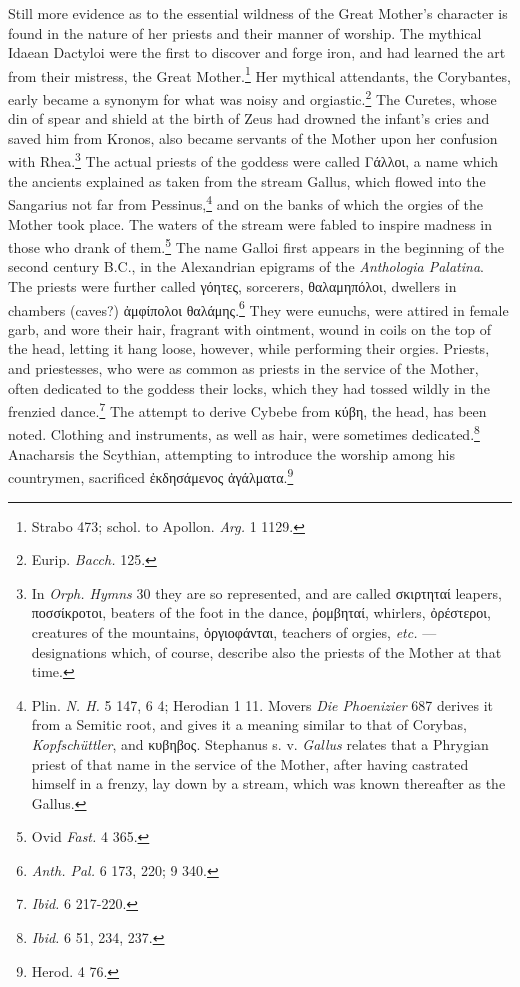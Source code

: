 \documentclass[a4paper, 11pt, oneside, polutonikogreek, english]{article}
\begin{document}
Still more evidence as to the essential wildness of the Great Mother's character is found in the nature of her priests and their manner of worship. The mythical Idaean Dactyloi were the first to discover and forge iron, and had learned the art from their mistress, the Great Mother.\footnote{Strabo 473; schol. to Apollon. \emph{Arg.} 1 1129.} Her mythical attendants, the Corybantes, early became a synonym for what was noisy and orgiastic.\footnote{Eurip. \emph{Bacch.} 125.} The Curetes, whose din of spear and shield at the birth of Zeus had drowned the infant's cries and saved him from Kronos, also became servants of the Mother upon her confusion with Rhea.\footnote{In \emph{Orph. Hymns} 30 they are so represented, and are called σκιρτηταί leapers, ποσσίκροτοι, beaters of the foot in the dance, ῥομβηταί, whirlers, ὀρέστεροι, creatures of the mountains, ὀργιοφάνται, teachers of orgies, \emph{etc.} --- designations which, of course, describe also the priests of the Mother at that time.} The actual priests of the goddess were called Γάλλοι, a name which the ancients explained as taken from the stream Gallus, which flowed into the Sangarius not far from Pessinus,\footnote{Plin. \emph{N. H.} 5 147, 6 4; Herodian 1 11. Movers \emph{Die Phoenizier} 687 derives it from a Semitic root, and gives it a meaning similar to that of Corybas, \emph{Kopfschüttler}, and κυβηβος. Stephanus s. v. \emph{Gallus} relates that a Phrygian priest of that name in the service of the Mother, after having castrated himself in a frenzy, lay down by a stream, which was known thereafter as the Gallus.} and on the banks of which the orgies of the Mother took place. The waters of the stream were fabled to inspire madness in those who drank of them.\footnote{Ovid \emph{Fast.} 4 365.} The name Galloi first appears in the beginning of the second century \textsc{B.C.}, in the Alexandrian epigrams of the \emph{Anthologia Palatina}. The priests were further called γόητες, sorcerers, θαλαμηπόλοι, dwellers in chambers (caves?) ἀμφίπολοι θαλάμης.\footnote{\emph{Anth. Pal.} 6 173, 220; 9 340.} They were eunuchs, were attired in female garb, and wore their hair, fragrant with ointment, wound in coils on the top of the head, letting it hang loose, however, while performing their orgies. Priests, and priestesses, who were as common as priests in the service of the Mother, often dedicated to the goddess their locks, which they had tossed wildly in the frenzied dance.\footnote{\emph{Ibid.} 6 217-220.} The attempt to derive Cybebe from κύβη, the head, has been noted. Clothing and instruments, as well as hair, were sometimes dedicated.\footnote{\emph{Ibid.} 6 51, 234, 237.} Anacharsis the Scythian, attempting to introduce the worship among his countrymen, sacrificed ἐκδησάμενος ἀγάλματα.\footnote{Herod. 4 76.}
\end{document}
